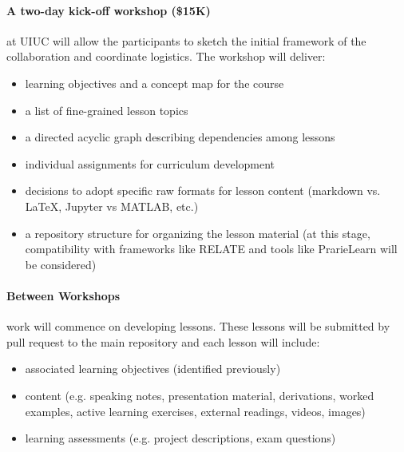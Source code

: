 \documentclass[11pt]{article}
\begin{document}
          \paragraph{A two-day kick-off workshop (\$15K)} at UIUC will allow the 
          participants to sketch the initial framework of 
          the collaboration and coordinate logistics. The workshop will 
          deliver:

          \begin{itemize} 
                  \item learning objectives\cite{bloom_bloom_1984} and a concept 
                          map\cite{novak_concept_1990} for the course
                  \item a list of fine-grained lesson topics
                  \item a directed acyclic graph describing dependencies among 
                          lessons
                  \item individual assignments for curriculum development
                  \item decisions to adopt specific raw formats for lesson content
                        (markdown vs. \LaTeX, Jupyter vs MATLAB, etc.)
                  \item a repository structure for organizing the lesson 
                          material (at this stage, compatibility with 
                          frameworks like RELATE 
                          \cite{kloeckner_relate_2017,kloeckner_relate_2017} 
                          and tools like PrarieLearn 
                          \cite{west_prairielearn:_2015} will be considered)
          \end{itemize} 

          \paragraph{Between Workshops} work will commence on developing 
          lessons. These lessons will be submitted by pull request to the main 
          repository and each lesson will include:
          \begin{itemize} 
                  \item associated learning objectives (identified previously)
                \item content (e.g. speaking notes, presentation material, 
                        derivations, worked examples, active learning  
                          exercises, external readings, videos, images)
                  \item learning assessments (e.g. project descriptions, exam questions) 
          \end{itemize} 
\end{document}

